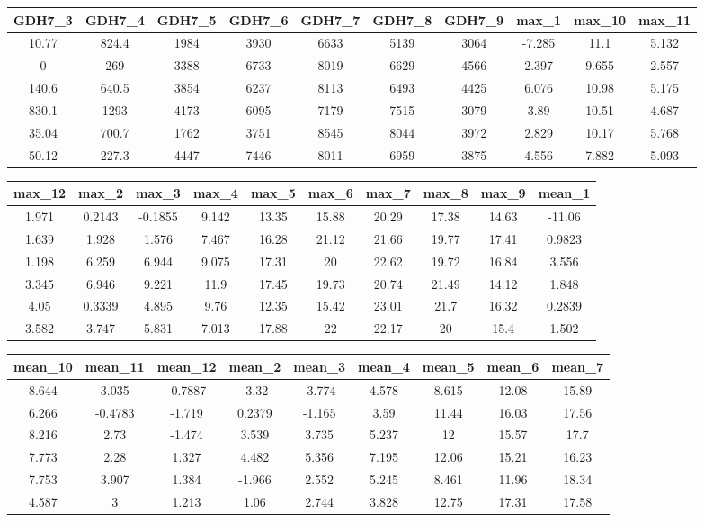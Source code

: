 \documentclass[10pt,]{article}
\begin{document}
\begin{longtable}[]{@{}cccccccccc@{}}
\toprule
GDH7\_3 & GDH7\_4 & GDH7\_5 & GDH7\_6 & GDH7\_7 & GDH7\_8 & GDH7\_9 &
max\_1 & max\_10 & max\_11\tabularnewline
\midrule
\endhead
10.77 & 824.4 & 1984 & 3930 & 6633 & 5139 & 3064 & -7.285 & 11.1 &
5.132\tabularnewline
0 & 269 & 3388 & 6733 & 8019 & 6629 & 4566 & 2.397 & 9.655 &
2.557\tabularnewline
140.6 & 640.5 & 3854 & 6237 & 8113 & 6493 & 4425 & 6.076 & 10.98 &
5.175\tabularnewline
830.1 & 1293 & 4173 & 6095 & 7179 & 7515 & 3079 & 3.89 & 10.51 &
4.687\tabularnewline
35.04 & 700.7 & 1762 & 3751 & 8545 & 8044 & 3972 & 2.829 & 10.17 &
5.768\tabularnewline
50.12 & 227.3 & 4447 & 7446 & 8011 & 6959 & 3875 & 4.556 & 7.882 &
5.093\tabularnewline
\bottomrule
\end{longtable}

\begin{longtable}[]{@{}cccccccccc@{}}
\toprule
max\_12 & max\_2 & max\_3 & max\_4 & max\_5 & max\_6 & max\_7 & max\_8 &
max\_9 & mean\_1\tabularnewline
\midrule
\endhead
1.971 & 0.2143 & -0.1855 & 9.142 & 13.35 & 15.88 & 20.29 & 17.38 & 14.63
& -11.06\tabularnewline
1.639 & 1.928 & 1.576 & 7.467 & 16.28 & 21.12 & 21.66 & 19.77 & 17.41 &
0.9823\tabularnewline
1.198 & 6.259 & 6.944 & 9.075 & 17.31 & 20 & 22.62 & 19.72 & 16.84 &
3.556\tabularnewline
3.345 & 6.946 & 9.221 & 11.9 & 17.45 & 19.73 & 20.74 & 21.49 & 14.12 &
1.848\tabularnewline
4.05 & 0.3339 & 4.895 & 9.76 & 12.35 & 15.42 & 23.01 & 21.7 & 16.32 &
0.2839\tabularnewline
3.582 & 3.747 & 5.831 & 7.013 & 17.88 & 22 & 22.17 & 20 & 15.4 &
1.502\tabularnewline
\bottomrule
\end{longtable}

\begin{longtable}[]{@{}ccccccccc@{}}
\toprule
mean\_10 & mean\_11 & mean\_12 & mean\_2 & mean\_3 & mean\_4 & mean\_5 &
mean\_6 & mean\_7\tabularnewline
\midrule
\endhead
8.644 & 3.035 & -0.7887 & -3.32 & -3.774 & 4.578 & 8.615 & 12.08 &
15.89\tabularnewline
6.266 & -0.4783 & -1.719 & 0.2379 & -1.165 & 3.59 & 11.44 & 16.03 &
17.56\tabularnewline
8.216 & 2.73 & -1.474 & 3.539 & 3.735 & 5.237 & 12 & 15.57 &
17.7\tabularnewline
7.773 & 2.28 & 1.327 & 4.482 & 5.356 & 7.195 & 12.06 & 15.21 &
16.23\tabularnewline
7.753 & 3.907 & 1.384 & -1.966 & 2.552 & 5.245 & 8.461 & 11.96 &
18.34\tabularnewline
4.587 & 3 & 1.213 & 1.06 & 2.744 & 3.828 & 12.75 & 17.31 &
17.58\tabularnewline
\bottomrule
\end{longtable}
\end{document}
